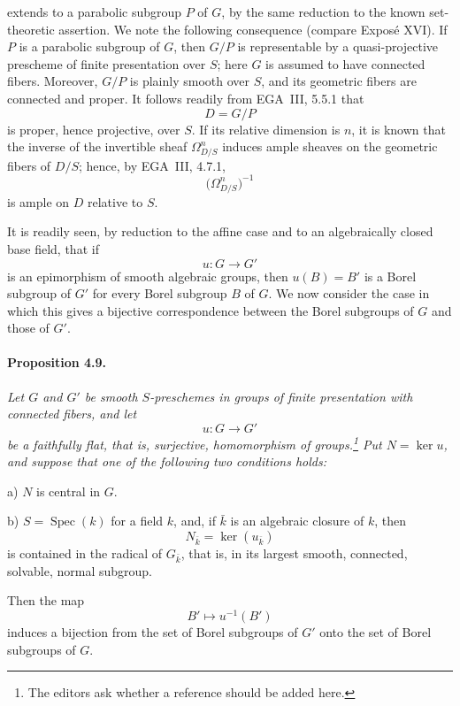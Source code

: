  extends to a parabolic subgroup \(P\) of \(G\), by
the same reduction to the known set-theoretic assertion. We note
the following consequence \textup{(compare Exposé XVI)}. If \(P\)
is a parabolic subgroup of \(G\), then \(G/P\) is representable by
a quasi-projective prescheme of finite presentation over \(S\);
here \(G\) is assumed to have connected fibers. Moreover, \(G/P\)
is plainly smooth over \(S\), and its geometric fibers are
connected and proper. It follows readily from EGA~III, 5.5.1 that
\[
  D=G/P
\]
is proper, hence projective, over \(S\). If its relative dimension
is \(n\), it is known that the inverse of the invertible sheaf
\(\Omega^n_{D/S}\) induces ample sheaves on the geometric fibers of
\(D/S\); hence, by EGA~III, 4.7.1,
\[
  \bigl(\Omega^n_{D/S}\bigr)^{-1}
\]
is ample on \(D\) relative to \(S\).



It is readily seen, by reduction to the affine case and to an
algebraically closed base field, that if
\[
  u\colon G\longrightarrow G'
\]
is an epimorphism of smooth algebraic groups, then \(u(B)=B'\) is a
Borel subgroup of \(G'\) for every Borel subgroup \(B\) of \(G\).
We now consider the case in which this gives a bijective
correspondence between the Borel subgroups of \(G\) and those of
\(G'\).

\paragraph{\textbf{Proposition 4.9.}}
{\itshape Let \(G\) and \(G'\) be smooth \(S\)-preschemes in groups
of finite presentation with connected fibers, and let
\[
  u\colon G\longrightarrow G'
\]
be a faithfully flat, that is, surjective, homomorphism of
groups.\footnote{The editors ask whether a reference should be
added here.} Put \(N=\ker u\), and suppose that one of the following
two conditions holds:

\smallskip
\noindent
\textup{a)} \(N\) is central in \(G\).

\smallskip
\noindent
\textup{b)} \(S=\operatorname{Spec}(k)\) for a field \(k\), and, if
\(\bar k\) is an algebraic closure of \(k\), then
\[
  N_{\bar k}=\ker(u_{\bar k})
\]
is contained in the radical of \(G_{\bar k}\), that is, in its
largest smooth, connected, solvable, normal subgroup.

\smallskip
Then the map
\[
  B'\longmapsto u^{-1}(B')
\]
induces a bijection from the set of Borel subgroups of \(G'\) onto
the set of Borel subgroups of \(G\).}

